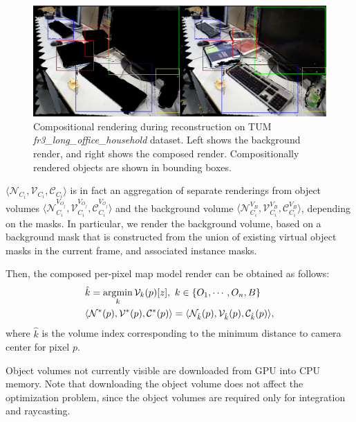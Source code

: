 \begin{figure}[t!]
    \centering
    \includegraphics[width=\linewidth]{figs/compositional-render.pdf}
    \caption{Compositional rendering during reconstruction on TUM \textit{fr3\_long\_office\_household} dataset. Left shows the background render, and right shows the composed render. Compositionally rendered objects are shown in bounding boxes.}
    \label{fig:compositional_render}
\end{figure}

\(\langle \mathcal{N}_{C_i}, \mathcal{V}_{C_i}, \mathcal{C}_{C_i} \rangle \) is in fact an aggregation of separate renderings from object volumes \(\langle \mathcal{N}_{C_i}^{V_{{O}_j}}, \mathcal{V}_{C_i}^{V_{{O}_j}}, \mathcal{C}_{C_i}^{V_{\mathcal{O}_j}} \rangle \) and the background volume \(\langle \mathcal{N}_{C_i}^{V_{B}}, \mathcal{V}_{C_i}^{V_{B}}, \mathcal{C}_{C_i}^{V_{{B}}}  \rangle \), depending on the masks. In particular, we render the background volume, based on a background mask that is constructed from the union of existing virtual object masks in the current frame, and associated instance masks.

Then, the composed per-pixel map model render can be obtained as follows:
\begin{align}
    &\hat{k} = \operatorname*{\arg\!\min}_k \mathcal{V}_k(p)[z], ~k \in \{O_1, \cdots, O_n, B\} \\
    &\langle \mathcal{N}^*(p), \mathcal{V}^*(p), \mathcal{C}^*(p) \rangle = \langle  \mathcal{N}_{\hat{k}}(p), \mathcal{V}_{\hat{k}}(p), \mathcal{C}_{\hat{k}}(p) \rangle,
\end{align}
where $\hat{k}$ is the volume index corresponding to the minimum distance to camera center for pixel $p$.

Object volumes not currently visible are downloaded from GPU into CPU memory. Note that downloading the object volume does not affect the optimization problem, since the object volumes are required only for integration and raycasting.
